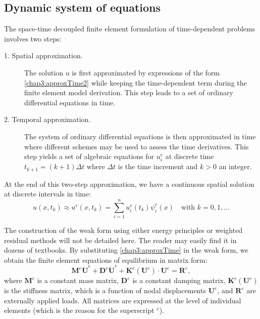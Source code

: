 	\subsection{Dynamic system of equations}	 \label{chap3:dynamic}
The space-time decoupled finite element formulation of time-dependent problems involves two steps:
\begin{description}
\item[1. Spatial approximation.]
The solution $ u $ is first approximated by expressions of the form \eqref{chap3:approxTime2} while keeping the time-dependent term during the finite element model derivation. This step leads to a set of ordinary differential equations in time.
\item[2. Temporal approximation.]
The system of ordinary differential equations is then approximated in time where different schemes may be used to assess the time derivatives. This step yields a set of algebraic equations for $ u^e_i $ at discrete time $ t_{k+1} = (k+1) \Delta t$ where $ \Delta t $ is the time increment and $ k > 0$ an integer. 
\end{description}
At the end of this two-step approximation, we have a continuous spatial solution at discrete intervals in time:
\begin{equation}
\label{chap3:approxTime}
u(x, t_k) \approx u^e(x, t_k) = \sum_{i=1}^n u^e_i(t_k) \psi^e_i(x) \quad \text{with } k = 0, 1, \ldots
\end{equation}
	
The construction of the weak form using either energy principles or weighted residual methods will not be detailed here. The reader may easily find it in dozens of textbooks. By substituting \eqref{chap3:approxTime} in the weak form, we obtain the finite element equations of equilibrium in matrix form:
\begin{equation}
\label{chap3:eqDynamic}
\mathbf{M}^e \mathbf{\ddot U}^e + \mathbf{D}^e \mathbf{ \dot U}^e + \mathbf{K}^e(\mathbf{U}^e) \cdot \mathbf{U}^e = \mathbf{R}^e,
\end{equation}
where $ \mathbf{M}^e $ is a constant mass matrix, $\mathbf{D}^e$ is a constant damping matrix, $ \mathbf{K}^e(\mathbf{U}^e) $ is the stiffness matrix, which is a function of nodal displacements $\mathbf{U}^e$, and $\mathbf{R}^e$ are externally applied loads. All matrices are expressed at the level of individual elements (which is the reason for the superscript $ ^e $).


